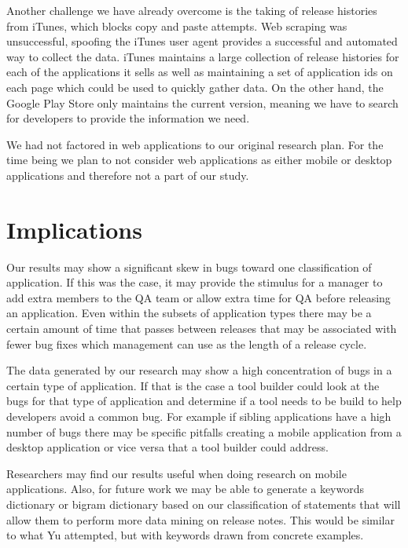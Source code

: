 \documentclass{acm_proc_article-sp}
\begin{document}
Another challenge we have already overcome is the taking of release histories from iTunes, which blocks copy and paste attempts. 
Web scraping was unsuccessful, spoofing the iTunes user agent provides a successful and automated way to collect the data.
iTunes maintains a large collection of release histories for each of the applications it sells as well as maintaining a set of application ids on each page which could be used to quickly gather data.
On the other hand, the Google Play Store only maintains the current version, meaning we have to search for developers to provide the information we need.

We had not factored in web applications to our original research plan. For the time being we plan to not consider web applications as either mobile or desktop applications and therefore not a part of our study.

\section{Implications}
 Our results may show a significant skew in bugs toward one classification of application. If this was the case, it may provide the stimulus for a manager to add extra members to the QA team or allow extra time for QA before releasing an application. 
Even within the subsets of application types there may be a certain amount of time that passes between releases that may be associated with fewer bug fixes which management can use as the length of a release cycle.

 The data generated by our research may show a high concentration of bugs in a certain type of application. 
If that is the case a tool builder could look at the bugs for that type of application and determine if a tool needs to be build to help developers avoid a common bug. 
For example if sibling applications have a high number of bugs there may be specific pitfalls creating a mobile application from a desktop application or vice versa that a tool builder could address.

 Researchers may find our results useful when doing research on mobile applications.
Also, for future work we may be able to generate a keywords dictionary or bigram dictionary based on our classification of statements that will allow them to perform more data mining on release notes.
This would be similar to what Yu \cite{YuChangeLogs} attempted, but with keywords drawn from concrete examples.
\end{document}
